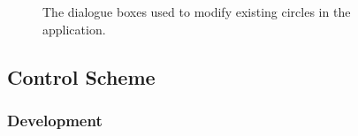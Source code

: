 \documentclass[12pt,twoside,notitlepage,xetex]{report}
\begin{document}
{\begin{center}
\begin{figure}[H]
\begin{center}
\end{center}
\caption{The dialogue boxes used to modify existing circles in the application.}
\label{fig:Dialogues}
\end{figure}
\end{center}

\subsection{Control Scheme}


\subsubsection{Development}

}
\end{document}
